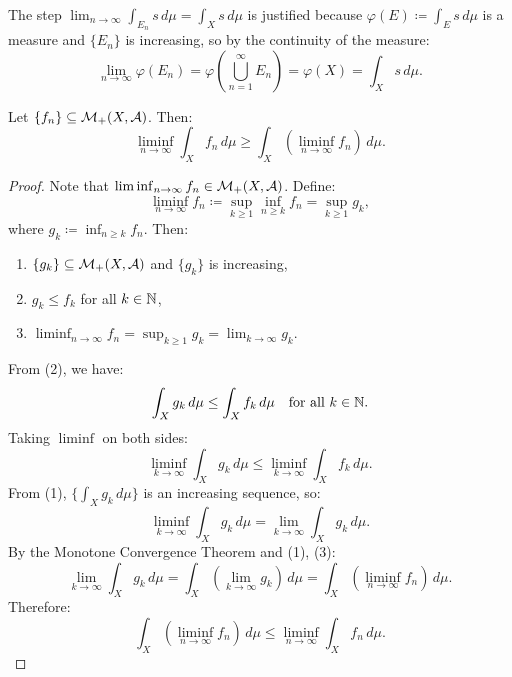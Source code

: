 \begin{remark}
The step $\lim_{n \to \infty} \int_{E_n} s \, d\mu = \int_X s \, d\mu$ is justified because $\varphi(E) \coloneqq \int_E s \, d\mu$ is a measure and $\{E_n\}$ is increasing, so by the continuity of the measure:
\[
\lim_{n \to \infty} \varphi(E_n) = \varphi\left(\bigcup_{n=1}^{\infty} E_n\right) = \varphi(X) = \int_X s \, d\mu.
\]
\end{remark}

\begin{lemma}
Let $\{f_n\} \subseteq \mathcal{M}_+(X, \mathcal{A})$. Then:
\[
\liminf_{n \to \infty} \int_X f_n \, d\mu \geq \int_X \left(\liminf_{n \to \infty} f_n\right) \, d\mu.
\]
\end{lemma}

\begin{proof}
Note that $\liminf_{n \to \infty} f_n \in \mathcal{M}_+(X, \mathcal{A})$. Define:
\[
\liminf_{n \to \infty} f_n \coloneqq \sup_{k \geq 1} \inf_{n \geq k} f_n = \sup_{k \geq 1} g_k,
\]
where $g_k \coloneqq \inf_{n \geq k} f_n$. Then:
\begin{enumerate}
    \item $\{g_k\} \subseteq \mathcal{M}_+(X, \mathcal{A})$ and $\{g_k\}$ is increasing,
    \item $g_k \leq f_k$ for all $k \in \mathbb{N}$,
    \item $\liminf_{n \to \infty} f_n = \sup_{k \geq 1} g_k = \lim_{k \to \infty} g_k$.
\end{enumerate}
From (2), we have:
\[
\int_X g_k \, d\mu \leq \int_X f_k \, d\mu \quad \text{for all } k \in \mathbb{N}.
\]
Taking $\liminf$ on both sides:
\[
\liminf_{k \to \infty} \int_X g_k \, d\mu \leq \liminf_{k \to \infty} \int_X f_k \, d\mu.
\]
From (1), $\{\int_X g_k \, d\mu\}$ is an increasing sequence, so:
\[
\liminf_{k \to \infty} \int_X g_k \, d\mu = \lim_{k \to \infty} \int_X g_k \, d\mu.
\]
By the Monotone Convergence Theorem and (1), (3):
\[
\lim_{k \to \infty} \int_X g_k \, d\mu = \int_X \left(\lim_{k \to \infty} g_k\right) \, d\mu = \int_X \left(\liminf_{n \to \infty} f_n\right) \, d\mu.
\]
Therefore:
\[
\int_X \left(\liminf_{n \to \infty} f_n\right) \, d\mu \leq \liminf_{n \to \infty} \int_X f_n \, d\mu.
\]
\end{proof}

